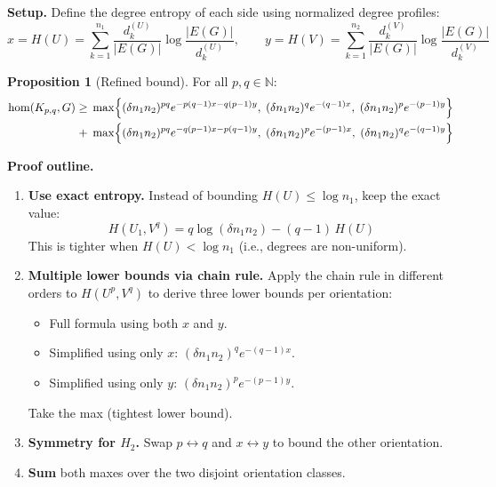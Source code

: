 \documentclass[12pt,a4paper]{article}
\theoremstyle{definition}
\newtheorem{proposition}[theorem]{Proposition}
\newcommand{\hom}{\operatorname{hom}}
\begin{document}
\textbf{Setup.} Define the degree entropy of each side using normalized degree profiles:
\[
  x = H(U) = \sum_{k=1}^{n_1} \frac{d_k^{(U)}}{|E(G)|} \log \frac{|E(G)|}{d_k^{(U)}}, \qquad
  y = H(V) = \sum_{k=1}^{n_2} \frac{d_k^{(V)}}{|E(G)|} \log \frac{|E(G)|}{d_k^{(V)}}
\]

\begin{proposition}[Refined bound]
  For all $p,q \in \mathbb{N}$:
  \begin{align*}
    \hom(K_{p,q}, G) \geq\;
      &\max\Bigl\{
          (\delta n_1 n_2)^{pq} e^{-p(q-1)x - q(p-1)y},\;
          (\delta n_1 n_2)^{q} e^{-(q-1)x},\;
          (\delta n_1 n_2)^{p} e^{-(p-1)y}
        \Bigr\} \\
      +\;&\max\Bigl\{
          (\delta n_1 n_2)^{pq} e^{-q(p-1)x - p(q-1)y},\;
          (\delta n_1 n_2)^{p} e^{-(p-1)x},\;
          (\delta n_1 n_2)^{q} e^{-(q-1)y}
        \Bigr\}
  \end{align*}
\end{proposition}

\textbf{Proof outline.}
\begin{enumerate}
  \item \textbf{Use exact entropy.} Instead of bounding $H(U) \leq \log n_1$, keep the exact value:
    \[H(U_1, V^q) = q\log(\delta n_1 n_2) - (q-1)\,H(U)\]
    This is tighter when $H(U) < \log n_1$ (i.e., degrees are non-uniform).

  \item \textbf{Multiple lower bounds via chain rule.} Apply the chain rule in different orders to
    $H(U^p, V^q)$ to derive three lower bounds per orientation:
    \begin{itemize}
      \item Full formula using both $x$ and $y$.
      \item Simplified using only $x$: $(\delta n_1 n_2)^q e^{-(q-1)x}$.
      \item Simplified using only $y$: $(\delta n_1 n_2)^p e^{-(p-1)y}$.
    \end{itemize}
    Take the max (tightest lower bound).

  \item \textbf{Symmetry for $H_2$.} Swap $p \leftrightarrow q$ and $x \leftrightarrow y$ to bound
    the other orientation.

  \item \textbf{Sum} both maxes over the two disjoint orientation classes.
\end{enumerate}
\end{document}
